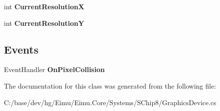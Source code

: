\begin{DoxyCompactItemize}
\item 
\hypertarget{class_eimu_1_1_core_1_1_systems_1_1_s_chip8_1_1_graphics_device_a4d8bb2843acdf236e9c20270f3f8f417}{
int {\bfseries CurrentResolutionX}}
\label{class_eimu_1_1_core_1_1_systems_1_1_s_chip8_1_1_graphics_device_a4d8bb2843acdf236e9c20270f3f8f417}

\item 
\hypertarget{class_eimu_1_1_core_1_1_systems_1_1_s_chip8_1_1_graphics_device_a95f061806e80bcc7c67d4c01dad65ea2}{
int {\bfseries CurrentResolutionY}}
\label{class_eimu_1_1_core_1_1_systems_1_1_s_chip8_1_1_graphics_device_a95f061806e80bcc7c67d4c01dad65ea2}

\end{DoxyCompactItemize}
\subsection*{Events}
\begin{DoxyCompactItemize}
\item 
\hypertarget{class_eimu_1_1_core_1_1_systems_1_1_s_chip8_1_1_graphics_device_abccd2bedfbe957fed5ada1a583e51d47}{
EventHandler {\bfseries OnPixelCollision}}
\label{class_eimu_1_1_core_1_1_systems_1_1_s_chip8_1_1_graphics_device_abccd2bedfbe957fed5ada1a583e51d47}

\end{DoxyCompactItemize}


The documentation for this class was generated from the following file:\begin{DoxyCompactItemize}
\item 
C:/base/dev/hg/Eimu/Eimu.Core/Systems/SChip8/GraphicsDevice.cs\end{DoxyCompactItemize}
